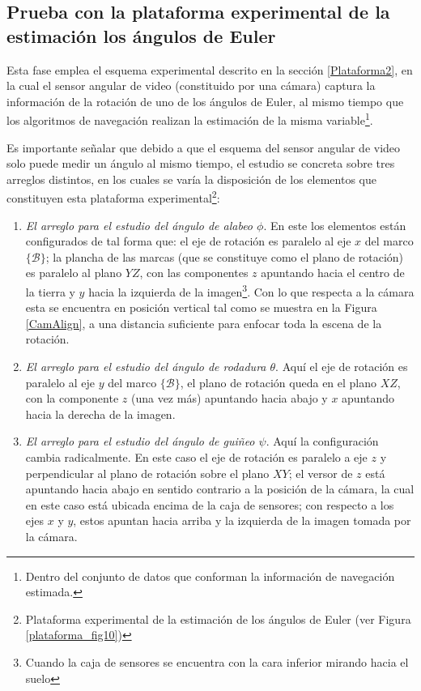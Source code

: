 \documentclass[conference]{IEEEtran}
\newcommand{\marco}[1]{\{\mathcal{#1}\}}
\begin{document}
\subsection{Prueba con la plataforma experimental de la estimación los ángulos de Euler}
Esta fase emplea el esquema experimental descrito en la sección \ref{Plataforma2}, en la cual el sensor angular de video (constituido por una cámara) captura la información de la rotación de uno de los ángulos de Euler, al mismo tiempo que los algoritmos de navegación realizan la estimación de la misma variable\footnote{Dentro del conjunto de datos que conforman la información de navegación estimada.}.\par
Es importante señalar que debido a que el esquema del sensor angular de video solo puede medir un ángulo al mismo tiempo, el estudio se concreta sobre tres arreglos distintos, en los cuales se varía la disposición de los elementos que constituyen esta plataforma experimental\footnote{Plataforma experimental de la estimación de los ángulos de Euler (ver Figura \ref{plataforma_fig10})}:
\begin{enumerate}
\item \emph{El arreglo para el estudio del ángulo de alabeo $\phi$}. En este los elementos están configurados de tal forma que: el eje de rotación es paralelo al eje $x$ del marco $\marco{B}$; la plancha de las marcas (que se constituye como el plano de rotación) es paralelo al plano $YZ$, con las componentes $z$ apuntando hacia el centro de la tierra y $y$ hacia la izquierda de la imagen\footnote{Cuando la caja de sensores se encuentra con la cara inferior mirando hacia el suelo}. Con lo que respecta a la cámara esta se encuentra en posición vertical tal como se muestra en la Figura \ref{CamAlign}, a una distancia suficiente para enfocar toda la escena de la rotación.
\item \emph{El arreglo para el estudio del ángulo de rodadura $\theta$}. Aquí el eje de rotación es paralelo al eje $y$ del marco $\marco{B}$, el plano de rotación queda en el plano $XZ$, con la componente $z$ (una vez más) apuntando hacia abajo y $x$ apuntando hacia la derecha de la imagen.
\item \emph{El arreglo para el estudio del ángulo de guiñeo $\psi$}. Aquí la configuración cambia radicalmente. En este caso el eje de rotación es paralelo a eje $z$ y perpendicular al plano de rotación sobre el plano $XY$; el versor de $z$ está apuntando hacia abajo en sentido contrario a la posición de la cámara, la cual en este caso está ubicada encima de la caja de sensores; con respecto a los ejes $x$ y $y$, estos apuntan hacia arriba y la izquierda de la imagen tomada por la cámara.
\end{enumerate}
\end{document}
